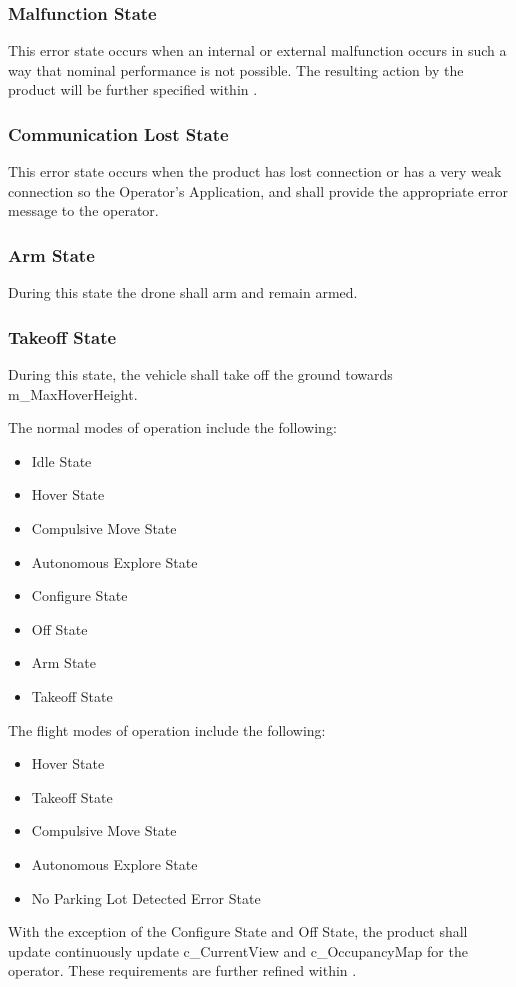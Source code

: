 \documentclass{article}
\begin{document}
\subsubsection{Malfunction State}
\label{Malfunction State}
This error state occurs when an internal or external malfunction occurs in such a way that nominal performance is not possible. The resulting action by the product will be further specified within . 
\subsubsection{Communication Lost State}
\label{Communication Lost State}
This error state occurs when the product has lost connection or has a very weak connection so the Operator's Application, and shall provide the appropriate error message to the operator.
\subsubsection{Arm State}
\label{Arm State}
During this state the drone shall arm and remain armed.
\subsubsection{Takeoff State}
\label{Takeoff State}
During this state, the vehicle shall take off the ground towards m\_MaxHoverHeight.

The normal modes of operation include the following:
\begin{itemize}
  \item Idle State
  \item Hover State
  \item Compulsive Move State
  \item Autonomous Explore State
  \item Configure State
  \item Off State
  \item Arm State
  \item Takeoff State
\end{itemize}
The flight modes of operation \label{flightModes} include the following:
\begin{itemize}
  \item Hover State
  \item Takeoff State
  \item Compulsive Move State
  \item Autonomous Explore State
   \item No Parking Lot Detected Error State
\end{itemize}
With the exception of the Configure State and Off State, the product shall update continuously update c\_CurrentView and c\_OccupancyMap for the operator. These requirements are further refined within . 
\end{document}
